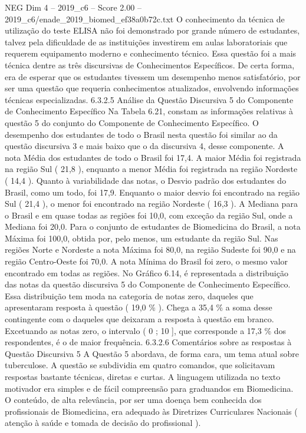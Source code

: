 \begin{textsample}{NEG Dim 4 – 2019\_c6 – Score 2.00 – 2019\_c6/enade\_2019\_biomed\_ef38a0b72c.txt}
O conhecimento da técnica de utilização do teste ELISA não foi demonstrado por grande número de estudantes, talvez pela dificuldade de as instituições investirem em aulas laboratoriais que requerem equipamento moderno e conhecimento técnico.
Essa questão foi a mais técnica dentre as três discursivas de Conhecimentos Específicos.
De certa forma, era de esperar que os estudantes tivessem um desempenho menos satisfatório, por ser uma questão que requeria conhecimentos atualizados, envolvendo informações técnicas especializadas. 6.3.2.5 Análise da Questão Discursiva 5 do Componente de Conhecimento Específico Na Tabela 6.21, constam as informações relativas à questão 5 do conjunto do Componente de Conhecimento Específico.
O desempenho dos estudantes de todo o Brasil nesta questão foi similar ao da questão discursiva 3 e mais baixo que o da discursiva 4, desse componente.
A nota Média dos estudantes de todo o Brasil foi 17,4.
A maior Média foi registrada na região Sul ( 21,8 ), enquanto a menor Média foi registrada na região Nordeste ( 14,4 ).
Quanto à variabilidade das notas, o Desvio padrão dos estudantes do Brasil, como um todo, foi 17,9.
Enquanto o maior desvio foi encontrado na região Sul ( 21,4 ), o menor foi encontrado na região Nordeste ( 16,3 ).
A Mediana para o Brasil e em quase todas as regiões foi 10,0, com exceção da região Sul, onde a Mediana foi 20,0.
Para o conjunto de estudantes de Biomedicina do Brasil, a nota Máxima foi 100,0, obtida por, pelo menos, um estudante da região Sul.
Nas regiões Norte e Nordeste a nota Máxima foi 80,0, na região Sudeste foi 90,0 e na região Centro-Oeste foi 70,0.
A nota Mínima do Brasil foi zero, o mesmo valor encontrado em todas as regiões.
No Gráfico 6.14, é representada a distribuição das notas da questão discursiva 5 do Componente de Conhecimento Específico.
Essa distribuição tem moda na categoria de notas zero, daqueles que apresentaram resposta à questão ( 19,0 \% ).
Chega a 35,4 \% a soma desse contingente com o daqueles que deixaram a resposta à questão em branco.
Excetuando as notas zero, o intervalo ( 0 ; 10 ], que corresponde a 17,3 \% dos respondentes, é o de maior frequência. 6.3.2.6 Comentários sobre as respostas à Questão Discursiva 5 A Questão 5 abordava, de forma cara, um tema atual sobre tuberculose.
A questão se subdividia em quatro comandos, que solicitavam respostas bastante técnicas, diretas e curtas.
A linguagem utilizada no texto motivador era simples e de fácil compreensão para graduandos em Biomedicina.
O conteúdo, de alta relevância, por ser uma doença bem conhecida dos profissionais de Biomedicina, era adequado às Diretrizes Curriculares Nacionais ( atenção à saúde e tomada de decisão do profissional ).

\end{textsample}

